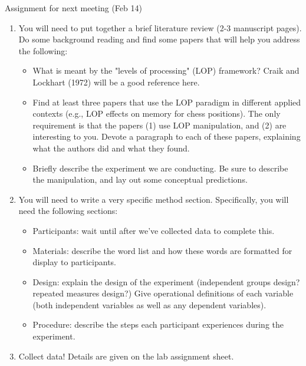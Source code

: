 \documentclass[11pt]{article}
\begin{document}
Assignment for next meeting (Feb 14)
\begin{enumerate}
\item You will need to put together a brief literature review (2-3 manuscript pages).  Do some background reading and find some papers that will help you address the following:
\begin{itemize}
\item What is meant by the "levels of processing" (LOP) framework?  Craik and Lockhart (1972) will be a good reference here.
\item Find at least three papers that use the LOP paradigm in different applied contexts (e.g., LOP effects on memory for chess positions).  The only requirement is that the papers (1) use LOP manipulation, and (2) are interesting to you.  Devote a paragraph to each of these papers, explaining what the authors did and what they found.
\item Briefly describe the experiment we are conducting.  Be sure to describe the manipulation, and lay out some conceptual predictions.
\end{itemize}

\item You will need to write a very specific method section.  Specifically, you will need the following sections:
\begin{itemize}
\item Participants: wait until after we've collected data to complete this.
\item Materials: describe the word list and how these words are formatted for display to participants.
\item Design: explain the design of the experiment (independent groups design? repeated measures design?)  Give operational definitions of each variable (both independent variables as well as any dependent variables).
\item Procedure: describe the steps each participant experiences during the experiment.
\end{itemize}

\item Collect data!  Details are given on the lab assignment sheet.
\end{enumerate}
\end{document}
